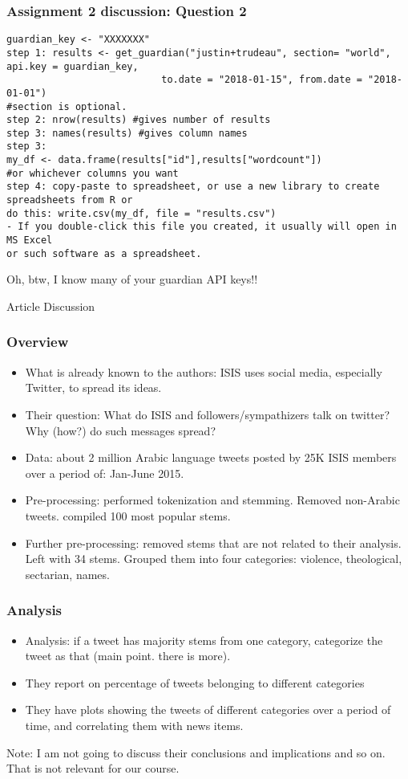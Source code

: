 \documentclass{beamer}
\begin{document}
\begin{frame}[fragile]
\frametitle{Assignment 2 discussion: Question 2}
\tiny
\begin{verbatim}
guardian_key <- "XXXXXXX" 
step 1: results <- get_guardian("justin+trudeau", section= "world", api.key = guardian_key,
                           to.date = "2018-01-15", from.date = "2018-01-01")
#section is optional.
step 2: nrow(results) #gives number of results
step 3: names(results) #gives column names
step 3: 
my_df <- data.frame(results["id"],results["wordcount"])
#or whichever columns you want
step 4: copy-paste to spreadsheet, or use a new library to create spreadsheets from R or 
do this: write.csv(my_df, file = "results.csv")
- If you double-click this file you created, it usually will open in MS Excel 
or such software as a spreadsheet.
\end{verbatim}
\normalsize
\pause Oh, btw, I know many of your guardian API keys!!
\end{frame}


\begin{frame}
\Large Article Discussion
\end{frame}

\begin{frame}
\frametitle{Overview}
\begin{itemize}
\item What is already known  to the authors: ISIS uses social media, especially Twitter, to spread its ideas. \pause
\item Their question: What do ISIS and followers/sympathizers talk on twitter? Why (how?) do such messages spread? \pause
\item Data: about 2 million Arabic language tweets posted by 25K ISIS members over a period of: Jan-June 2015. \pause
\item Pre-processing: performed tokenization and stemming. Removed non-Arabic tweets. compiled 100 most popular stems. 
\item Further pre-processing: removed stems that are not related to their analysis. Left with 34 stems. Grouped them into four categories: violence, theological, sectarian, names.\pause
\end{itemize}
\end{frame}

\begin{frame}
\frametitle{Analysis}
\begin{itemize}
\item Analysis: if a tweet has majority stems from one category, categorize the tweet as that (main point. there is more).
\item They report on percentage of tweets belonging to different categories
\item They have plots showing the tweets of different categories over a period of time, and correlating them with news items. 
\end{itemize}
Note: I am not going to discuss their conclusions and implications and so on. That is not relevant for our course.
\end{frame}
\end{document}
